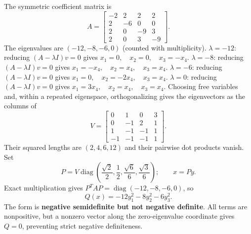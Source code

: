 The symmetric coefficient matrix is
\[
 A=\begin{bmatrix}-2&2&2&2\\2&-6&0&0\\2&0&-9&3\\2&0&3&-9\end{bmatrix}.
\]
The eigenvalues are $(-12,-8,-6,0)$ (counted with multiplicity).
$\lambda=-12$: reducing $(A-\lambda I)v=0$ gives
\( x_{1}=0,\quad x_{2}=0,\quad x_{3}=- x_{4} \).
$\lambda=-8$: reducing $(A-\lambda I)v=0$ gives
\( x_{1}=- x_{4},\quad x_{2}=x_{4},\quad x_{3}=x_{4} \).
$\lambda=-6$: reducing $(A-\lambda I)v=0$ gives
\( x_{1}=0,\quad x_{2}=- 2 x_{4},\quad x_{3}=x_{4} \).
$\lambda=0$: reducing $(A-\lambda I)v=0$ gives
\( x_{1}=3 x_{4},\quad x_{2}=x_{4},\quad x_{3}=x_{4} \).
Choosing free variables and, within a repeated eigenspace, orthogonalizing
gives the eigenvectors as the columns of
\[
 V=\begin{bmatrix}0&1&0&3\\0&-1&2&1\\1&-1&-1&1\\-1&-1&-1&1\end{bmatrix}.
\]
Their squared lengths are $(2,4,6,12)$ and their pairwise dot products vanish. Set
\[
 P=V\operatorname{diag}(\frac{\sqrt{2}}{2},\frac{1}{2},\frac{\sqrt{6}}{6},\frac{\sqrt{3}}{6});\qquad x=Py.
\]
Exact multiplication gives $P^TAP=\operatorname{diag}(-12,-8,-6,0)$, so
\[
 Q(x)=\boxed{- 12 y_{1}^{2} - 8 y_{2}^{2} - 6 y_{3}^{2}}.
\]
The form is \textbf{negative semidefinite but not negative definite}. All terms are nonpositive, but a nonzero vector along the zero-eigenvalue
coordinate gives $Q=0$, preventing strict negative definiteness.

